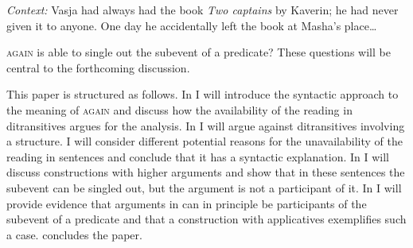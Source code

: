 \documentclass[output=paper]{langscibook}
\begin{document}
 \ea\label{ex:bondarenko:7}\textit{Context:} Vasja had always had the book \textit{Two captains} by Kaverin; he had never given it to anyone. One day he accidentally left the book at Masha’s place\dots
{}
\z
\z


 \textsc{again}{ is able to single out the  subevent of a predicate? These questions will be central to the forthcoming discussion.}



This paper is structured as follows. In  I will introduce the syntactic approach to the meaning of \textsc{again} and discuss how the availability of the  reading in  ditransitives argues for the  analysis. In  I will argue against  ditransitives involving a  structure. I will consider different potential reasons for the unavailability of the  reading in   sentences and conclude that it has a syntactic explanation. In  I will discuss constructions with higher  arguments and show that in these sentences the  subevent can be singled out, but the  argument is not a participant of it. In  I will provide evidence that  arguments in  can in principle be participants of the  subevent of a predicate and that a construction with  applicatives exemplifies such a case.  concludes the paper.
\end{document}
